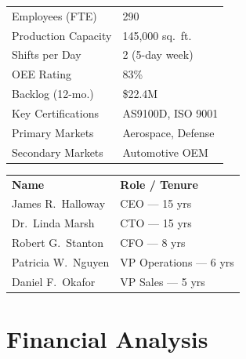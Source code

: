 \documentclass[11pt,a4paper]{article}
\begin{document}
\noindent
\begin{minipage}[t]{0.47\textwidth}
  \vspace{0pt}
  \begin{tcolorbox}[creditbox, title={\faIndustry\enspace Operational Snapshot}]
    \small
    \begin{tabular}{@{}L{3.2cm} L{2.8cm}@{}}
      Employees (FTE)      & 290 \\
      Production Capacity  & 145,000 sq.\ ft. \\
      Shifts per Day       & 2 (5-day week) \\
      OEE Rating           & 83\% \\
      Backlog (12-mo.)     & \$22.4M \\
      Key Certifications   & AS9100D, ISO 9001 \\
      Primary Markets      & Aerospace, Defense \\
      Secondary Markets    & Automotive OEM \\
    \end{tabular}
  \end{tcolorbox}
\end{minipage}%
\hfill
\begin{minipage}[t]{0.47\textwidth}
  \vspace{0pt}
  \begin{tcolorbox}[creditbox, title={\faUsers\enspace Management Team}]
    \small
    \begin{tabular}{@{}L{3.0cm} L{3.0cm}@{}}
      \textbf{Name}         & \textbf{Role / Tenure} \\[2pt]
      James R.\ Halloway    & CEO — 15 yrs \\
      Dr.\ Linda Marsh      & CTO — 15 yrs \\
      Robert G.\ Stanton    & CFO — 8 yrs \\
      Patricia W.\ Nguyen   & VP Operations — 6 yrs \\
      Daniel F.\ Okafor     & VP Sales — 5 yrs \\
    \end{tabular}
  \end{tcolorbox}
\end{minipage}

\par
\vspace{4mm}

\section{Financial Analysis}
\end{document}
